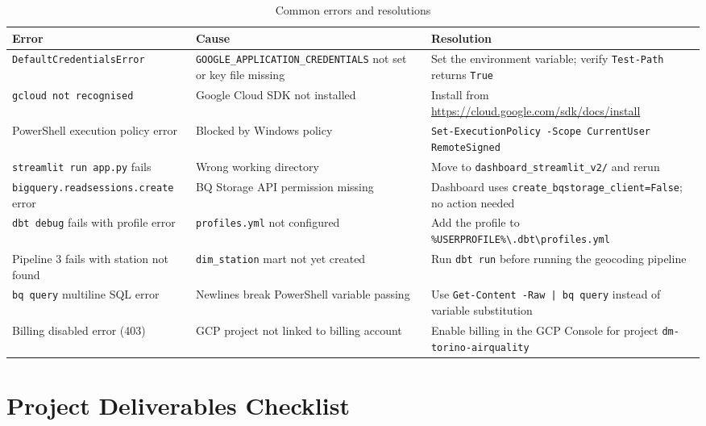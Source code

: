 \documentclass[11pt,a4paper]{article}
\begin{document}
\begin{table}[h!]
\centering
\caption{Common errors and resolutions}
\small
\begin{tabularx}{\textwidth}{@{}lXX@{}}
\toprule
\textbf{Error} & \textbf{Cause} & \textbf{Resolution} \\
\midrule
\texttt{DefaultCredentialsError}
  & \texttt{GOOGLE\_APPLICATION\_CREDENTIALS} not set or key file missing
  & Set the environment variable; verify \texttt{Test-Path} returns \texttt{True} \\
\addlinespace
\texttt{gcloud not recognised}
  & Google Cloud SDK not installed
  & Install from \url{https://cloud.google.com/sdk/docs/install} \\
\addlinespace
PowerShell execution policy error
  & Blocked by Windows policy
  & \texttt{Set-ExecutionPolicy -Scope CurrentUser RemoteSigned} \\
\addlinespace
\texttt{streamlit run app.py} fails
  & Wrong working directory
  & Move to \texttt{dashboard\_streamlit\_v2/} and rerun \\
\addlinespace
\texttt{bigquery.readsessions.create} error
  & BQ Storage API permission missing
  & Dashboard uses \texttt{create\_bqstorage\_client=False}; no action needed \\
\addlinespace
\texttt{dbt debug} fails with profile error
  & \texttt{profiles.yml} not configured
  & Add the profile to \texttt{\%USERPROFILE\%\textbackslash .dbt\textbackslash profiles.yml} \\
\addlinespace
Pipeline 3 fails with station not found
  & \texttt{dim\_station} mart not yet created
  & Run \texttt{dbt run} before running the geocoding pipeline \\
\addlinespace
\texttt{bq query} multiline SQL error
  & Newlines break PowerShell variable passing
  & Use \texttt{Get-Content -Raw | bq query} instead of variable substitution \\
\addlinespace
Billing disabled error (403)
  & GCP project not linked to billing account
  & Enable billing in the GCP Console for project \texttt{dm-torino-airquality} \\
\bottomrule
\end{tabularx}
\end{table}

\section{Project Deliverables Checklist}
\end{document}
